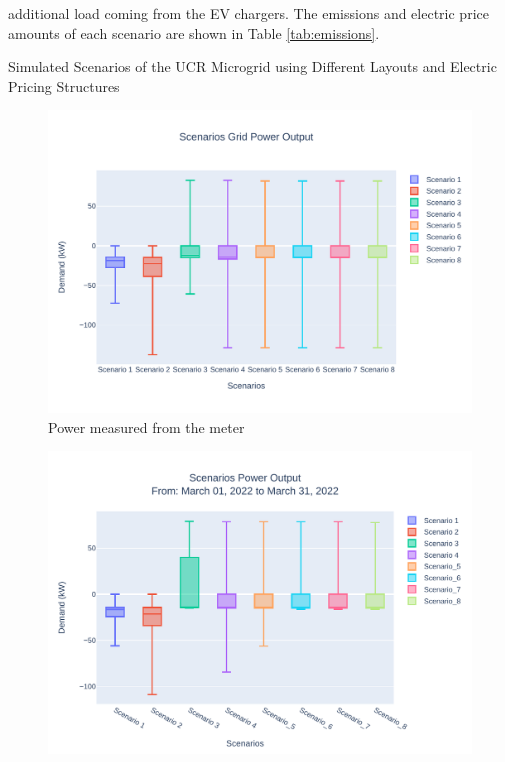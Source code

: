 \documentclass[conference]{IEEEtran}
\begin{document}
additional load coming from the EV chargers. The emissions and electric price amounts of each scenario are shown in Table \ref{tab:emissions}.
	\begin{table}[H]
		\caption{Simulated Scenarios of the UCR Microgrid using Different Layouts and Electric Pricing Structures}
		\tiny
		
		\normalsize
		\label{tab:scenarios}
	\end{table}
	
	\begin{figure}[H]
		\centering
		\includegraphics[width=0.9\linewidth]{Fig/scenarios_power_output_boxplot}
		\caption{Power measured from the meter}
		\label{fig:scenariospoweroutputboxplot}
	\end{figure}
	
	\begin{figure}[H]
		\centering
		\includegraphics[width=1\linewidth]{Fig/0_Scn_Output_Run_3_Mar_01_2022_to_Mar_31_2022}
		\caption{}
		\label{fig:0scnoutputrun2mar012022tomar312022}
	\end{figure}
\end{document}
